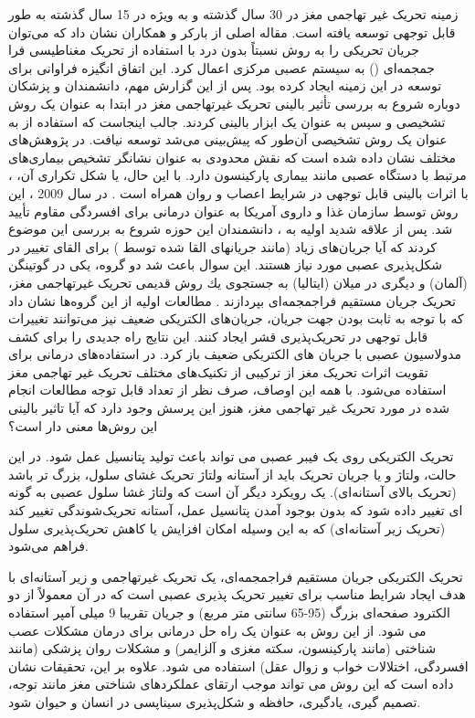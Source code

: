 زمینه تحریک غیر تهاجمی مغز در 30 سال گذشته و به ویژه در 15 سال گذشته به طور قابل توجهی توسعه یافته است. مقاله اصلی از بارکر و همکاران 
\cite{barker1985non}
نشان داد كه می‌توان جریان تحریكی را به روش نسبتاً بدون درد با استفاده از تحریک مغناطیسی فرا جمجمه‌ای
 () 
به سیستم عصبی مركزی اعمال کرد. این اتفاق انگیزه فراوانی برای توسعه در این زمینه ایجاد کرده بود. پس از این گزارش مهم، دانشمندان و پزشکان دوباره شروع به بررسی تأثیر بالینی تحریک غیرتهاجمی مغز در ابتدا به عنوان یک روش تشخیصی و سپس به عنوان یک ابزار بالینی کردند.
جالب اینجاست که استفاده از
به عنوان یک روش تشخیصی آن‌طور که پیش‌بینی می‌شد توسعه نیافت. در پژوهش‌های مختلف نشان داده شده است که
نقش محدودی به عنوان نشانگر تشخیص بیماری‌های مرتبط با دستگاه عصبی مانند بیماری پارکینسون دارد. با این حال، 
 یا شکل تکراری آن، 
، با اثرات بالینی قابل توجهی در شرایط اعصاب و روان همراه است
\cite{rossi2009safety}
. در سال 2009 ، این روش توسط سازمان غذا و داروی آمریکا 
 به عنوان درمانی برای افسردگی مقاوم 
تأیید شد.
پس از علاقه شدید اولیه به 
، دانشمندان این حوزه شروع به بررسی این موضوع کردند که آیا جریان‌های زیاد (مانند جریانهای القا شده توسط 
) برای القای تغییر در شکل‌پذیری عصبی مورد نیاز هستند. این سوال باعث شد دو گروه، یكی در گوتینگن (آلمان) و دیگری در میلان (ایتالیا) به جستجوی یك روش قدیمی تحریک غیرتهاجمی مغز، تحریک جریان مستقیم فراجمجمه‌ای 
بپردازند
\cite{nitsche2008transcranial}.
مطالعات اولیه از این گروه‌ها نشان داد که با توجه به ثابت بودن جهت جریان‌، جریان‌های الکتریکی ضعیف نیز می‌توانند تغییرات قابل توجهی در تحریک‌پذیری قشر ایجاد کنند. این نتایج راه جدیدی را برای کشف مدولاسیون عصبی با جریان های الکتریکی ضعیف باز کرد. در استفاده‌های درمانی برای تقویت اثرات تحریک مغز از ترکیبی از تکنیک‌های مختلف تحریک غیر تهاجمی مغز استفاده می‌شود. با همه این اوصاف، صرف نظر از تعداد قابل توجه مطالعات انجام شده در مورد تحریک غیر تهاجمی مغز، هنوز این پرسش وجود دارد که آیا تاثیر بالینی این روش‌ها معنی دار است؟


تحریک الکتریکی روی یک فیبر عصبی می تواند باعث تولید پتانسیل عمل شود. در این حالت، ولتاژ و یا جریان تحریک باید از آستانه ولتاژ تحریک غشای سلول، بزرگ تر باشد (تحریک بالای آستانه‌ای). یک رویکرد دیگر آن است که ولتاژ غشا سلول عصبی به گونه ای تغییر داده شود که بدون بوجود آمدن پتانسیل عمل، آستانه تحریک‌شوندگی تغییر کند (تحریک زیر آستانه‌ای) که به این وسیله امکان افزایش یا کاهش تحریک‌پذیری سلول فراهم می‌شود.

تحریک الکتریکی جریان مستقیم فراجمجمه‌ای، یک تحریک غیرتهاجمی و زیر آستانه‌ای با هدف ایجاد شرایط مناسب برای تغییر تحریک پذیری عصبی است که در آن معمولاً از دو الکترود صفحه‌ای بزرگ (95-65 سانتی متر مربع) و جریان تقریبا 9 میلی آمپر استفاده می شود. از این روش به عنوان یک راه حل درمانی برای درمان مشکلات عصب شناختی (مانند پارکینسون، سکته مغزی و آلزایمر) و مشکلات روان پزشکی (مانند افسردگی، اختلالات خواب و زوال عقل) استفاده می شود. علاوه بر این، تحقیقات نشان داده است که این روش می تواند موجب ارتقای عملکردهای شناختی مغز مانند توجه، تصمیم گیری، یادگیری، حافظه و شکل‌پذیری سیناپسی در انسان و حیوان شود.

